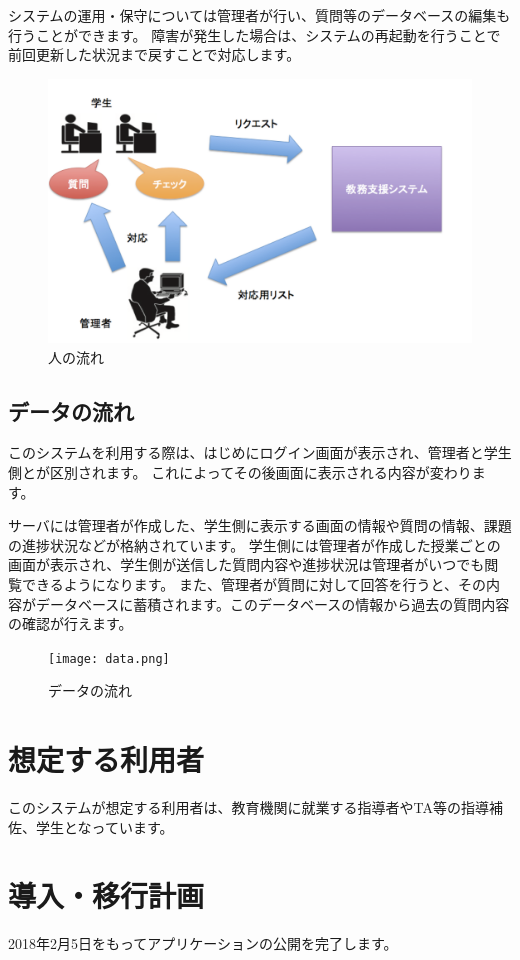 \documentclass[a4j,titlepage]{ujarticle}
\begin{document}
システムの運用・保守については管理者が行い、質問等のデータベースの編集も行うことができます。
障害が発生した場合は、システムの再起動を行うことで前回更新した状況まで戻すことで対応します。
\begin{figure}[h]

\centering
   \includegraphics[width=13cm]{hito.png}
  \caption{人の流れ}
\end{figure}
\newpage
\subsection{データの流れ}
このシステムを利用する際は、はじめにログイン画面が表示され、管理者と学生側とが区別されます。
これによってその後画面に表示される内容が変わります。

サーバには管理者が作成した、学生側に表示する画面の情報や質問の情報、課題の進捗状況などが格納されています。
学生側には管理者が作成した授業ごとの画面が表示され、学生側が送信した質問内容や進捗状況は管理者がいつでも閲覧できるようになります。
また、管理者が質問に対して回答を行うと、その内容がデータベースに蓄積されます。このデータベースの情報から過去の質問内容の確認が行えます。

\begin{figure}[h]

\centering
   \texttt{[image: data.png]}
  \caption{データの流れ}
\end{figure}

\section{想定する利用者}
このシステムが想定する利用者は、教育機関に就業する指導者やTA等の指導補佐、学生となっています。

\section{導入・移行計画}
2018年2月5日をもってアプリケーションの公開を完了します。
\end{document}
